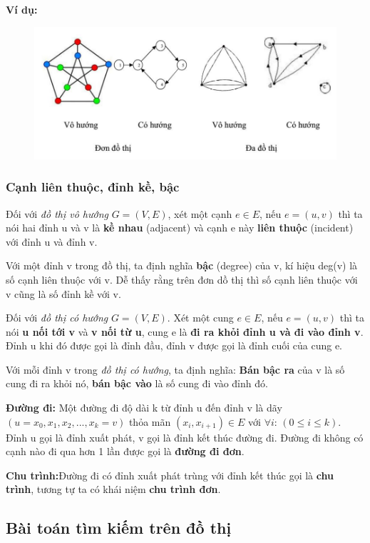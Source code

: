 \documentclass[a4paper,10pt]{article}
\begin{document}
\textbf{Ví dụ:}
\begin{figure}[h!]
  \centering
\includegraphics[scale=0.5]{images/pic2.png}
\end{figure}


\subsubsection{Cạnh liên thuộc, đỉnh kề, bậc}
Đối với \emph{đồ thị vô hướng } $G = (V, E)$, xét một cạnh $e \in E$, nếu $e = (u, v)$ thì ta nói hai đỉnh u và v là \textbf{kề nhau} (adjacent) và cạnh e này \textbf{liên thuộc} (incident) với đỉnh u và đỉnh v.

Với một đỉnh v trong đồ thị, ta định nghĩa \textbf{bậc} (degree) của v, kí hiệu deg(v) là số cạnh liên thuộc với v. Dễ thấy rằng trên đơn dồ thị thì số cạnh liên thuộc với v cũng là số đỉnh kề với v.

Đối với \emph{đồ thị có hướng} $G = (V, E)$. Xét một cung $e \in E$, nếu $e = (u, v)$ thì ta nói \textbf{u nối tới v} và \textbf{v nối từ u}, cung e là \textbf{đi ra khỏi đỉnh u và đi vào đỉnh v}. Đỉnh u khi đó được gọi là đỉnh đầu, đỉnh v được gọi là đỉnh cuối của cung e.

Với mỗi đỉnh v trong \emph{đồ thị có hướng}, ta định nghĩa: \textbf{Bán bậc ra } của v là số cung đi ra khỏi nó, \textbf{bán bậc vào } là số cung đi vào đỉnh đó.

\textbf{Đường đi:} Một đường đi độ dài k từ đỉnh u đến đỉnh v là dãy $(u=x_0, x_1, x_2, ... , x_k=v)$ thỏa mãn $(x_i, x_{i+1}) \in E$ với $\forall i$: $(0 \leq i \leq k)$. Đỉnh u gọi là đỉnh xuất phát, v gọi là đỉnh kết thúc đường đi. Đường đi không có cạnh nào đi qua hơn 1 lần được gọi là \textbf{đường đi đơn}.

\textbf{Chu trình:}Đường đi có đỉnh xuất phát trùng với đỉnh kết thúc gọi là \textbf{chu trình}, tương tự ta có khái niệm \textbf{chu trình đơn}.

\subsection{Bài toán tìm kiếm trên đồ thị}
\end{document}
